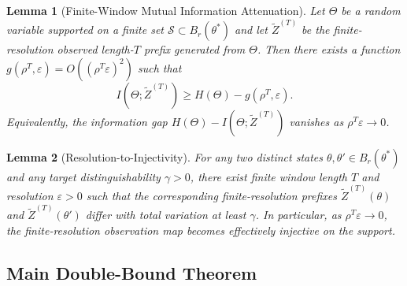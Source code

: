 \documentclass[12pt]{article}
\theoremstyle{definition}
\theoremstyle{plain}
\newtheorem{lemma}{Lemma}[section]
\begin{document}
\begin{lemma}[Finite-Window Mutual Information Attenuation]\label{lem:mi-attenuation}
Let \(\Theta\) be a random variable supported on a finite set \(\mathcal{S}\subset B_r(\theta^*)\) and let \(\widetilde Z^{(T)}\) be the finite-resolution observed length-\(T\) prefix generated from \(\Theta\). Then there exists a function \(g(\rho^T,\varepsilon)=O((\rho^T\varepsilon)^2)\) such that
\[
I(\Theta;\widetilde Z^{(T)}) \ge H(\Theta) - g(\rho^T,\varepsilon).
\]
Equivalently, the information gap \(H(\Theta)-I(\Theta;\widetilde Z^{(T)})\) vanishes as \(\rho^T\varepsilon\to 0\).
\end{lemma}

\begin{lemma}[Resolution-to-Injectivity]\label{lem:resolution-injectivity}
For any two distinct states \(\theta,\theta'\in B_r(\theta^*)\) and any target distinguishability \(\gamma>0\), there exist finite window length \(T\) and resolution \(\varepsilon>0\) such that the corresponding finite-resolution prefixes \(\widetilde Z^{(T)}(\theta)\) and \(\widetilde Z^{(T)}(\theta')\) differ with total variation at least \(\gamma\). In particular, as \(\rho^T\varepsilon\to 0\), the finite-resolution observation map becomes effectively injective on the support.
\end{lemma}

\subsection{Main Double-Bound Theorem}
\end{document}
